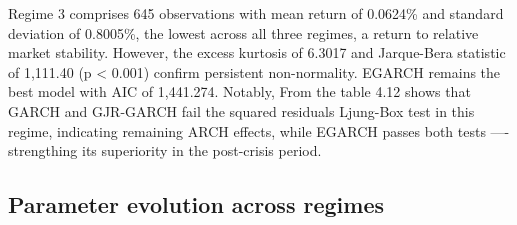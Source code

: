Regime 3 comprises 645 observations with mean return of 0.0624\% and standard deviation of 0.8005\%, the lowest across all three regimes, a return to relative market stability. However,  the excess kurtosis of 6.3017 and Jarque-Bera statistic of 1,111.40 (p < 0.001) confirm persistent non-normality. EGARCH remains the best model with AIC of 1,441.274. Notably, From the table 4.12 shows that GARCH and GJR-GARCH fail the squared residuals Ljung-Box test in this regime, indicating remaining ARCH effects, while EGARCH passes both tests —- strengthing its superiority in the post-crisis period.


\subsection{Parameter evolution across regimes}


\begin{table}[H]
\centering
\caption{Regime Parameter Evolution}
\label{tab:regime parameter evolution}
\end{table}

